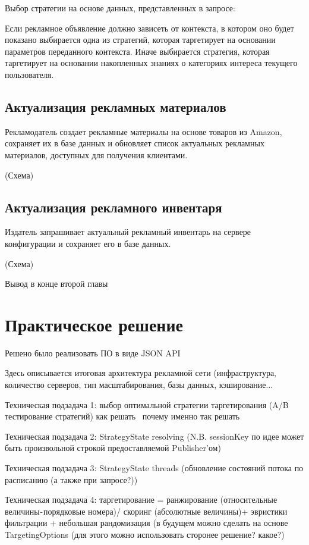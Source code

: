 \documentclass[specification,annotation,times]{itmo-student-thesis}
\begin{document}
Выбор стратегии на основе данных, представленных в запросе:

Если рекламное объявление должно зависеть от контекста, в котором оно будет показано выбирается одна из стратегий, которая таргетирует на основании параметров переданного контекста. Иначе выбирается стратегия, которая таргетирует на основании накопленных знаниях о категориях интереса текущего пользователя.

\section{Актуализация рекламных материалов}

Рекламодатель создает рекламные материалы на основе товаров из Amazon, сохраняет их в базе данных и обновляет список актуальных рекламных материалов, доступных для получения клиентами.

(Схема)


\section{Актуализация рекламного инвентаря}

Издатель запрашивает актуальный рекламный инвентарь на сервере конфигурации и сохраняет его в базе данных.

(Схема)

\chapterconclusion

Вывод в конце второй главы

\chapter{Практическое решение}

Решено было реализовать ПО в виде JSON API

Здесь описывается итоговая архитектура рекламной сети (инфраструктура, количество серверов, тип масштабирования, базы данных, кэширование...

Техническая подзадача 1: выбор оптимальной стратегии таргетирования (A/B тестирование стратегий)
как решать 
почему именно так решать

Техническая подзадача 2: StrategyState resolving (N.B. sessionKey по идее может быть произвольной строкой предоставляемой Publisher'ом)

Техническая подзадача 3: StrategyState threads (обновление состояний потока по расписанию (а также при запросе?))

Техническая подзадача 4: таргетирование = ранжирование (относительные величины - порядковые номера)/ скоринг (абсолютные величины)+ эвристики фильтрации + небольшая рандомизация (в будущем можно сделать на основе TargetingOptions (для этого можно использовать сторонее решение? какое?)
\end{document}
